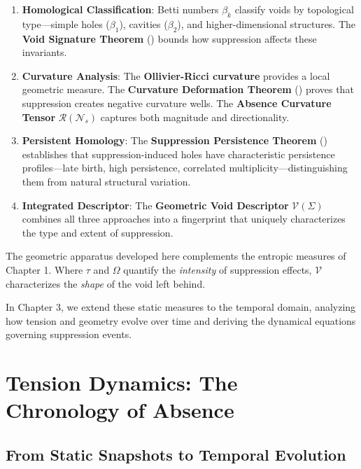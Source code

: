 \documentclass[12pt,a4paper]{article}
\theoremstyle{definition}
\theoremstyle{remark}
\newcommand{\NS}{\mathcal{N}_s}          %
\newcommand{\CO}{\Omega}                  %
\begin{document}
\begin{enumerate}
    \item \textbf{Homological Classification}: Betti numbers $\beta_k$ classify voids by topological type—simple holes ($\beta_1$), cavities ($\beta_2$), and higher-dimensional structures. The \textbf{Void Signature Theorem} () bounds how suppression affects these invariants.
    
    \item \textbf{Curvature Analysis}: The \textbf{Ollivier-Ricci curvature} provides a local geometric measure. The \textbf{Curvature Deformation Theorem} () proves that suppression creates negative curvature wells. The \textbf{Absence Curvature Tensor} $\mathcal{R}(\NS)$ captures both magnitude and directionality.
    
    \item \textbf{Persistent Homology}: The \textbf{Suppression Persistence Theorem} () establishes that suppression-induced holes have characteristic persistence profiles—late birth, high persistence, correlated multiplicity—distinguishing them from natural structural variation.
    
    \item \textbf{Integrated Descriptor}: The \textbf{Geometric Void Descriptor} $\mathcal{V}(\Sigma)$ combines all three approaches into a fingerprint that uniquely characterizes the type and extent of suppression.
\end{enumerate}

The geometric apparatus developed here complements the entropic measures of Chapter 1. Where $\tau$ and $\CO$ quantify the \emph{intensity} of suppression effects, $\mathcal{V}$ characterizes the \emph{shape} of the void left behind.

In Chapter 3, we extend these static measures to the temporal domain, analyzing how tension and geometry evolve over time and deriving the dynamical equations governing suppression events.

\newpage
\section{Tension Dynamics: The Chronology of Absence}

\subsection{From Static Snapshots to Temporal Evolution}
\end{document}
